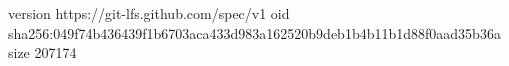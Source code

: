 version https://git-lfs.github.com/spec/v1
oid sha256:049f74b436439f1b6703aca433d983a162520b9deb1b4b11b1d88f0aad35b36a
size 207174
